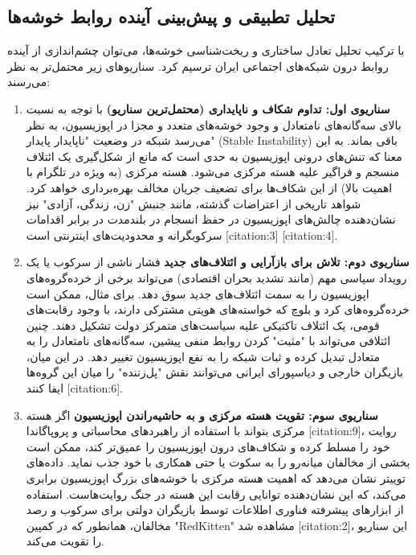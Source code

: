 \documentclass{article}
\begin{document}
	\subsection{تحلیل تطبیقی و پیش‌بینی آینده روابط خوشه‌ها}
	با ترکیب تحلیل تعادل ساختاری و ریخت‌شناسی خوشه‌ها، می‌توان چشم‌اندازی از آینده روابط درون شبکه‌های اجتماعی ایران ترسیم کرد. سناریوهای زیر محتمل‌تر به نظر می‌رسند:
	
	\begin{enumerate}
		\item \textbf{سناریوی اول: تداوم شکاف و ناپایداری (محتمل‌ترین سناریو)} با توجه به نسبت بالای سه‌گانه‌های نامتعادل و وجود خوشه‌های متعدد و مجزا در اپوزیسیون، به نظر می‌رسد شبکه در وضعیت "ناپایدار پایدار" (Stable Instability) باقی بماند. به این معنا که تنش‌های درونی اپوزیسیون به حدی است که مانع از شکل‌گیری یک ائتلاف منسجم و فراگیر علیه هسته مرکزی می‌شود. هسته مرکزی (به ویژه در تلگرام با اهمیت بالا) از این شکاف‌ها برای تضعیف جریان مخالف بهره‌برداری خواهد کرد. شواهد تاریخی از اعتراضات گذشته، مانند جنبش "زن، زندگی، آزادی" نیز نشان‌دهنده چالش‌های اپوزیسیون در حفظ انسجام در بلندمدت در برابر اقدامات سرکوبگرانه و محدودیت‌های اینترنتی است [citation:3] [citation:4].
		
		\item \textbf{سناریوی دوم: تلاش برای بازآرایی و ائتلاف‌های جدید} فشار ناشی از سرکوب یا یک رویداد سیاسی مهم (مانند تشدید بحران اقتصادی) می‌تواند برخی از خرده‌گروه‌های اپوزیسیون را به سمت ائتلاف‌های جدید سوق دهد. برای مثال، ممکن است خرده‌گروه‌های کرد و بلوچ که خواسته‌های هویتی مشترکی دارند، با وجود رقابت‌های قومی، یک ائتلاف تاکتیکی علیه سیاست‌های متمرکز دولت تشکیل دهند. چنین ائتلافی می‌تواند با "مثبت" کردن روابط منفی پیشین، سه‌گانه‌های نامتعادل را به متعادل تبدیل کرده و ثبات شبکه را به نفع اپوزیسیون تغییر دهد. در این میان، بازیگران خارجی و دیاسپورای ایرانی می‌توانند نقش "پل‌زننده" را میان این گروه‌ها ایفا کنند [citation:6].
		
		\item \textbf{سناریوی سوم: تقویت هسته مرکزی و به حاشیه‌راندن اپوزیسیون} اگر هسته مرکزی بتواند با استفاده از راهبردهای محاسباتی و پروپاگاندا [citation:9]، روایت خود را مسلط کرده و شکاف‌های درون اپوزیسیون را عمیق‌تر کند، ممکن است بخشی از مخالفان میانه‌رو را به سکوت یا حتی همکاری با خود جذب نماید. داده‌های توییتر نشان می‌دهد که اهمیت هسته مرکزی با خوشه‌های بزرگ اپوزیسیون برابری می‌کند، که این نشان‌دهنده توانایی رقابت این هسته در جنگ روایت‌هاست. استفاده از ابزارهای پیشرفته فناوری اطلاعات توسط بازیگران دولتی برای سرکوب و رصد مخالفان، همانطور که در کمپین "RedKitten" مشاهده شد [citation:2]، این سناریو را تقویت می‌کند.
	\end{enumerate}
\end{document}
